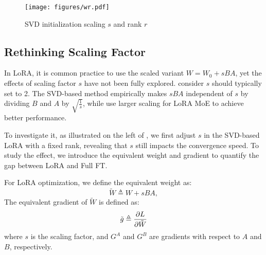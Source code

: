 \begin{figure}[t]
    \centering
    \texttt{[image: figures/wr.pdf]}
    \vspace{-5mm}
    \caption{SVD initialization \vs scaling $s$ and rank $r$ \label{fig:pissa}}
    \vspace{-10pt}
    \label{fig:intro}
\end{figure}

\subsection{Rethinking Scaling Factor} \label{sec:scale}

In LoRA, it is common practice to use the scaled variant \( W = W_0 + sBA \), yet the effects of scaling factor $s$ have not been fully explored. 
\citet{biderman2024lora} consider \( s \) should typically set to 2. The SVD-based method \cite{meng2024pissa} empirically makes \( sBA \) independent of \( s \) by dividing \( B \) and \( A \) by \( \sqrt{\frac{1}{s}} \), while \citet{tian2024hydraloraasymmetricloraarchitecture} use larger scaling for LoRA MoE to achieve better performance.

To investigate it, as illustrated on the left of , we first adjust \( s \) in the SVD-based LoRA with a fixed rank, revealing that \( s \) still impacts the convergence speed. To study the effect, we introduce the equivalent weight and gradient to quantify the gap between LoRA and Full FT.
\begin{definition}
\label{def:eg}
For LoRA optimization, we define the equivalent weight as:
\begin{equation}
    \tilde{W} \triangleq W + sBA,
\end{equation}
The equivalent gradient of \( \tilde{W} \) is defined as:
\begin{equation}
    \tilde{g} \triangleq \frac{\partial L}{\partial \tilde W}
\end{equation}
where \( s \) is the scaling factor, and \( G^A \) and \( G^B \) are gradients with respect to \( A \) and \( B \), respectively.
\end{definition}

